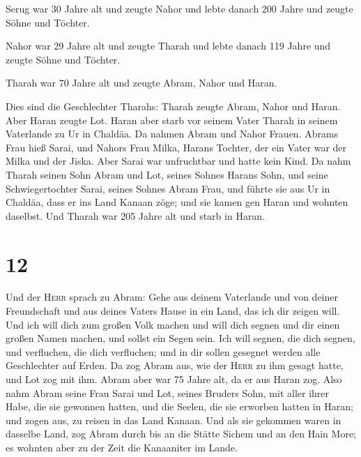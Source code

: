  Serug war 30 Jahre alt und zeugte Nahor 
und lebte danach 200 Jahre und zeugte Söhne und Töchter.

 Nahor war 29 Jahre alt und zeugte Tharah 
und lebte danach 119 Jahre und zeugte Söhne und Töchter.

 Tharah war 70 Jahre alt und zeugte Abram, Nahor und
Haran.

 Dies sind die Geschlechter Tharahs: Tharah zeugte Abram,
Nahor und Haran. Aber Haran zeugte Lot.  Haran aber starb
vor seinem Vater Tharah in seinem Vaterlande zu Ur in Chaldäa.
 Da nahmen Abram und Nahor Frauen. Abrams Frau hieß
Sarai, und Nahors Frau Milka, Harans Tochter, der ein Vater war der
Milka und der Jiska.  Aber Sarai war unfruchtbar und
hatte kein Kind.  Da nahm Tharah seinen Sohn Abram und
Lot, seines Sohnes Harans Sohn, und seine Schwiegertochter Sarai, seines
Sohnes Abram Frau, und führte sie aus Ur in Chaldäa, dass er ins Land
Kanaan zöge; und sie kamen gen Haran und wohnten daselbst.
 Und Tharah war 205 Jahre alt und starb in Haran.

\hypertarget{section-11}{%
\section{12}\label{section-11}}

 Und der \textsc{Herr} sprach zu Abram: Gehe aus deinem
Vaterlande und von deiner Freundschaft und aus deines Vaters Hause in
ein Land, das ich dir zeigen will.  Und ich will dich zum
großen Volk machen und will dich segnen und dir einen großen Namen
machen, und sollst ein Segen sein.  Ich will segnen, die
dich segnen, und verfluchen, die dich verfluchen; und in dir sollen
gesegnet werden alle Geschlechter auf Erden.  Da zog Abram
aus, wie der \textsc{Herr} zu ihm gesagt hatte, und Lot zog mit ihm.
Abram aber war 75 Jahre alt, da er aus Haran zog.  Also
nahm Abram seine Frau Sarai und Lot, seines Bruders Sohn, mit aller
ihrer Habe, die sie gewonnen hatten, und die Seelen, die sie erworben
hatten in Haran; und zogen aus, zu reisen in das Land Kanaan. Und als
sie gekommen waren in dasselbe Land,  zog Abram durch bis
an die Stätte Sichem und an den Hain More; es wohnten aber zu der Zeit
die Kanaaniter im Lande.

